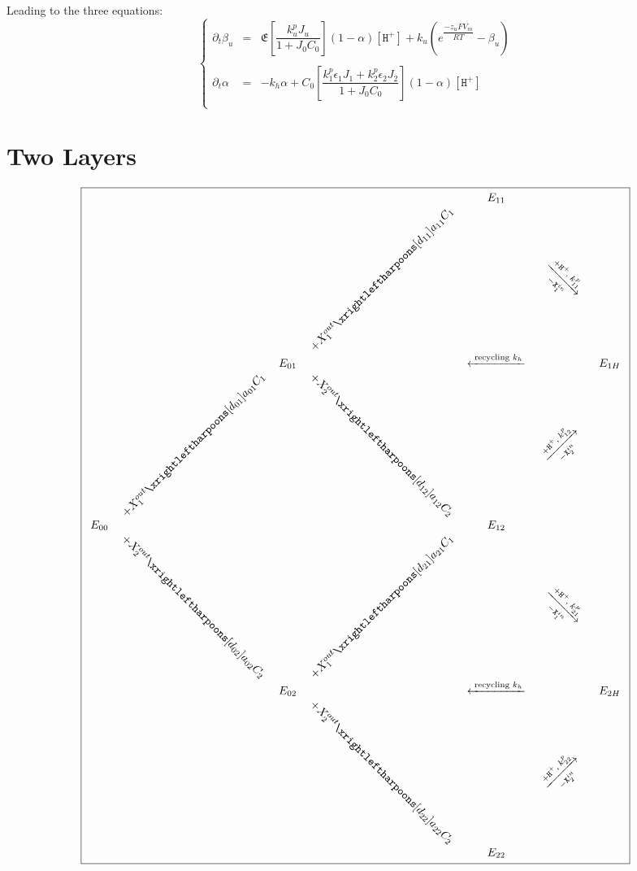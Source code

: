 \documentclass[aps,onecolumn,12pt]{revtex4}
\newcommand{\mychem}[1]{\mathtt{#1}}
\newcommand{\myconc}[1]{\left[#1\right]}
\newcommand{\spx}{\mychem{X}}
\newcommand{\spproton}{\mychem{H^+}}
\newcommand{\proton}{\myconc{\spproton}}
\begin{document}
Leading to the three equations:
\begin{equation}
\left\lbrace
\begin{array}{rcl}
	\partial_t \beta_u & = & \mathfrak{E} \left[\dfrac{k^p_u J_u}{1+J_0 C_0}\right] \left(1-\alpha\right) \proton
	 + k_u \left( e^{\dfrac{-z_u F V_m }{RT}}- \beta_u\right)\\
	\\
	\partial_t \alpha  & = &  -k_h\alpha + C_0 \left[\dfrac{k^p_1 \epsilon_1 J_1  + k^p_2 \epsilon_2 J_2   }{1+J_0C_0}\right] \left(1-\alpha\right) \proton\\
\end{array}
\right.
\end{equation}

\section{Two Layers}

\begin{equation}
\boxed{
\begin{array}{ccccccc}
 & &        &                                                  & E_{11} & & \\
 & &        & \rotatebox[origin=c]{45}{$+X_1^{out}\xrightleftharpoons[d_{11}]{a_{11}C_1}$} & &  \rotatebox[origin=c]{-45}{$\xrightarrow[-\spx_1^{in}]{+ \spproton, \; k^p_{11}}$}& \\
 & & E_{01} &  & \xleftarrow{\text{ recycling } k_h } & & E_{1H}\\
 &  \rotatebox[origin=c]{45}{$+X_1^{out}\xrightleftharpoons[d_{01}]{a_{01}C_1}$} &   & \rotatebox[origin=c]{-45}{$+X_2^{out}\xrightleftharpoons[d_{12}]{a_{12}C_2}$} & & \rotatebox[origin=c]{45}{$\xrightarrow[-\spx_2^{in}]{+ \spproton, \; k^p_{12}}$}&\\
E_{00} & &  & & E_{12} & & \\ 
  & \rotatebox[origin=c]{-45}{$+X_2^{out}\xrightleftharpoons[d_{02}]{a_{02}C_2}$} &  & \rotatebox[origin=c]{45}{$+X_1^{out}\xrightleftharpoons[d_{21}]{a_{21}C_1}$} & & \rotatebox[origin=c]{-45}{$\xrightarrow[-\spx_1^{in}]{+ \spproton, \; k^p_{21}}$} & \\
  & & E_{02} &   & \xleftarrow{\text{ recycling } k_h } & & E_{2H}\\
  & &  & \rotatebox[origin=c]{-45}{$+X_2^{out}\xrightleftharpoons[d_{22}]{a_{22}C_2}$} & & \rotatebox[origin=c]{45}{$\xrightarrow[-\spx_2^{in}]{+ \spproton, \; k^p_{22}}$} &\\
  & &  &  & E_{22} & &\\

 \end{array}
 }
\end{equation}
\end{document}
